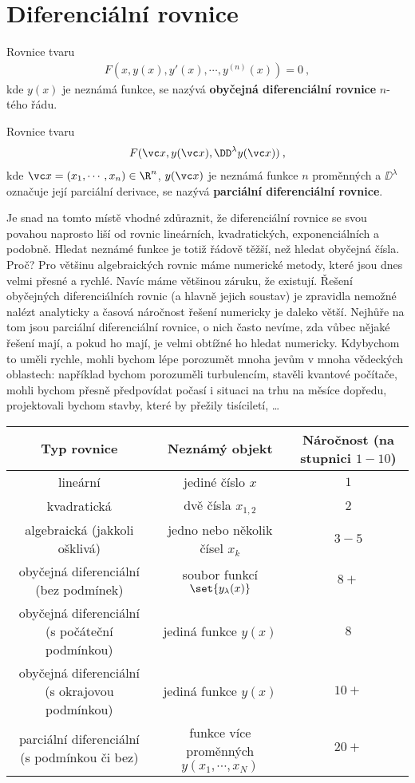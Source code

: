 \section{Diferenciální rovnice}

Rovnice tvaru \begin{align}
    F(x,y(x),y'(x),\cdots, y^{(n)}(x)) = 0 \:,
\end{align}
kde $y(x)$ je neznámá funkce, se nazývá \textbf{obyčejná diferenciální rovnice} $n$-tého řádu.

Rovnice tvaru \begin{align}
    F(\vc x, y(\vc x), \DD^\lambda y(\vc x)) \:,
\end{align}
kde $\vc x = (x_1, \cdots, x_n) \in \R^n$, $y(\vc x)$ je neznámá funkce $n$ proměnných a $\DD^\lambda$ označuje její parciální derivace, se nazývá \textbf{parciální diferenciální rovnice}.


Je snad na tomto místě vhodné zdůraznit, že diferenciální rovnice se svou povahou naprosto liší od rovnic lineárních, kvadratických, exponenciálních a podobně. Hledat neznámé funkce je totiž řádově těžší, než hledat obyčejná čísla. Proč? Pro většinu algebraických rovnic máme numerické metody, které jsou dnes velmi přesné a rychlé. Navíc máme většinou záruku, že existují. Řešení obyčejných diferenciálních rovnic (a hlavně jejich soustav) je zpravidla nemožné nalézt analyticky a časová náročnost řešení numericky je daleko větší. Nejhůře na tom jsou parciální diferenciální rovnice, o nich často nevíme, zda vůbec nějaké řešení mají, a pokud ho mají, je velmi obtížné ho hledat numericky. Kdybychom to uměli rychle, mohli bychom lépe porozumět mnoha jevům v mnoha vědeckých oblastech: například bychom porozuměli turbulencím, stavěli kvantové počítače, mohli bychom přesně předpovídat počasí i situaci na trhu na měsíce dopředu, projektovali bychom stavby, které by přežily tisíciletí, \dots

\begin{table}[H]
    \centering
    \begin{tabular}{c|c|c}
        Typ rovnice & Neznámý objekt & Náročnost (na stupnici $1-10$) \\
        \hline
        lineární & jediné číslo $x$ & $1$ \\
        kvadratická & dvě čísla $x_{1,2}$ & $2$ \\
        algebraická (jakkoli ošklivá) & jedno nebo několik čísel $x_k$ & $3-5$ \\
        \hline
        obyčejná diferenciální (bez podmínek) & soubor funkcí $\set {y_\lambda(x)}$ & $8+$ \\
        obyčejná diferenciální (s počáteční podmínkou) & jediná funkce $y(x)$ & $8$ \\
        obyčejná diferenciální (s okrajovou podmínkou) & jediná funkce $y(x)$ & $10+$ \\
        \hline
        parciální diferenciální (s podmínkou či bez) & funkce více proměnných $y(x_1, \cdots, x_N)$ & $20+$
    \end{tabular}
\end{table}

